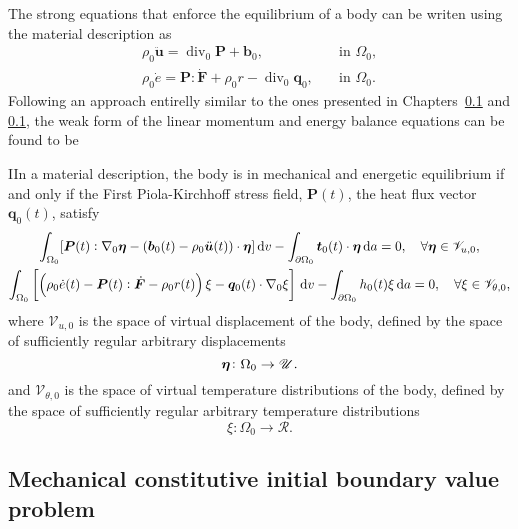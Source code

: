 The strong equations that enforce the equilibrium of a body can be writen using the material description as
\begin{align}
  \rho_0 \ddot{\bm u} = \operatorname{div}_0\bm P + \bm b_0, \quad & \text{in $\Omega_0$},\\
   \rho_0 \dot e = \bm P :\dot{\bm F} + \rho_0 r -\operatorname{div}_0 \bm q_0, \quad & \text{in  $\Omega_0$}.
\end{align}
Following an approach entirelly similar to the ones presented in Chapters~\ref{} and \ref{}, the weak form of the linear momentum and energy balance equations can be found to be
\begin{problem}
IIn a material description, the body is in mechanical and energetic equilibrium if and only if the First Piola-Kirchhoff stress field, \(\bm P(t)\), the heat flux vector \(\bm q_0(t)\), satisfy
    \begin{gather}
        \int_{\Omega_0} [\bm{P}(t):\nabla_0 \bm{\eta} - (\bm{b}_0(t) - \rho_0 \ddot{\bm u}(t))\cdot \bm{\eta}]\,\mathrm{d} v - \int_{\partial\Omega_0} \bm{t}_0(t)\cdot \bm{\eta}\,\mathrm{d} a = 0,\quad \forall \bm{\eta} \in \mathscr{V}_{u,0},\\
          \int_{\Omega_0}   \left[\left(\rho_0\dot e (t)- \bm P(t):\dot{\bm F}- \rho_0r(t)\right) \xi - \bm q_0(t)\cdot \nabla_0 \xi\right]\,\mathrm{d} v - \int_{\partial\Omega_0} h_0(t) \xi\,\mathrm{d} a = 0,\quad \forall \xi \in \mathscr{V}_{\theta,0},
    \end{gather}
 where $\mathscr{V}_{u,0}$ is the space of virtual displacement of the body, defined by the space of sufficiently regular arbitrary displacements
 \begin{equation}
     \bm{\eta}\colon \Omega_0\to \mathscr{U}.
 \end{equation}
 and  $\mathscr{V}_{\theta,0}$ is the space of virtual temperature distributions of the body, defined by the space of sufficiently regular arbitrary temperature distributions
 \begin{equation}
     \xi\colon \Omega_0\to \mathscr R.
 \end{equation}
\end{problem}

\subsection{Mechanical constitutive initial boundary value problem}

